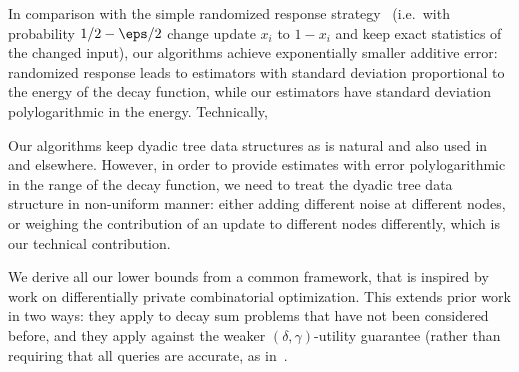 In comparison with the simple randomized response strategy~\cite{rr} (i.e.~with probability $1/2 - \eps/2$ change update $x_i$ to $1-x_i$ and keep exact statistics of the changed input), our algorithms achieve exponentially smaller additive error: randomized response leads to estimators with standard deviation proportional to the energy of the decay function, while our estimators have standard deviation polylogarithmic in the energy. Technically, 
\begin{packed_item}
\item
Our algorithms keep dyadic tree data structures as is natural and also used in~\cite{dwork-continual,chan2010private} and elsewhere. However, in order to provide estimates with error polylogarithmic in the range of the decay function, we need to treat the dyadic tree data structure in non-uniform manner: either adding different noise at different nodes, or weighing the contribution of an update to different nodes differently, which is our technical contribution.
\item
We derive all our lower bounds from a common framework, that is inspired by work on differentially private combinatorial optimization. This extends prior work in two ways:  they apply to decay sum
problems that have not been considered before, and they apply against the
weaker $(\delta, \gamma)$-utility  guarantee  (rather than requiring
that all queries are accurate, as in~\cite{dwork-continual}. 
\end{packed_item}






